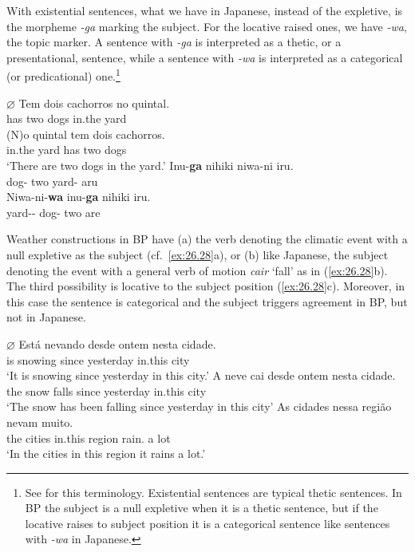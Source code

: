 \documentclass[output=paper]{langsci/langscibook}
\begin{document}
With existential sentences, what we have in Japanese, instead of the expletive,
is the morpheme  \emph{-ga} marking the subject. For the locative raised ones,
we have \emph{-wa}, the topic marker.  A sentence with \emph{-ga} is
interpreted as a thetic, or a presentational, sentence, while a sentence with
\emph{-wa} is interpreted as a categorical (or predicational) one.\footnote{See
    \citet{Kuroda1972} for this terminology.  Existential sentences are typical
    thetic sentences. In \gls{BP} the subject is a
null expletive when it is a thetic sentence, but if the locative raises to
subject position it is a categorical sentence like sentences with \emph{-wa} in
Japanese.}

\ea%
    \label{ex:26.26}
    \ea
    \gll \textbf{$\varnothing$} Tem dois cachorros no quintal.\\
        has two dogs in.the yard\\
    \ex
    \gll (N)o quintal  tem dois cachorros.\\
        in.the yard has two dogs\\
    \glt \enquote*{There are two dogs in the yard.}
    \z
\ex%
    \label{ex:26.27}
    \ea
    \gll    Inu-\textbf{ga} nihiki  niwa-ni iru.\\
            dog-\Nom{}  two yard-\Loc{} aru\\
    \ex
    \gll    Niwa-ni-\textbf{wa} inu-\textbf{ga} nihiki iru.\\
            yard-\Loc{}-\Topic{} dog-\Nom{} two are\\
    \z
\z

Weather constructions in \gls{BP} have (a) the verb
denoting the climatic event with a null expletive as the subject  (cf.\
\ref{ex:26.28}a), or  (b) like Japanese, the subject denoting  the event
with a general verb of motion \emph{cair} \enquote*{fall} as in
(\ref{ex:26.28}b).  The third possibility is locative  to the
subject position (\ref{ex:26.28}c).  Moreover, in this case the sentence is
categorical and the subject triggers agreement in \gls{BP}\il{Brazilian
Portuguese}, but not in Japanese.

\ea%
    \label{ex:26.28}
    \ea
	\gll	$\varnothing$ Está nevando  desde ontem nesta cidade.\\
			{} is  snowing    since yesterday in.this city\\
	\glt	\enquote*{It is snowing since yesterday in this city.}
    \ex
	\gll	A neve   cai   desde ontem   nesta cidade.\\
			the snow falls since yesterday in.this city\\
	\glt	\enquote*{The snow has been falling since yesterday in this city}
    \ex
	\gll	As cidades nessa região nevam muito.\\
            the cities    in.this region  rain.\Tpl{} {a lot}\\
	\glt	\enquote*{In the cities in this region it rains a lot.}
    \z
\z
\end{document}
